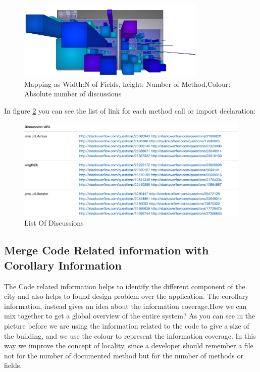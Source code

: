\documentclass[]{usiinfbachelorproject}
\begin{document}
\begin{figure}[H]
	\centering
	\includegraphics[width=0.8\textwidth]{images/discAbsLang}
	
	\caption[Discussion Mapping]{Mapping as Width:N of Fields, height: Number of Method,Colour: Absolute number of discussions\label{fig:disc}}

\end{figure}

In figure \ref{fig:list} you can see the list of link for each method call or import declaration:


 \begin{figure}[H]
	\centering
	\includegraphics[width=1\textwidth]{images/listOfDiscussions}
		\caption[List Of Discussions]{List Of Discussions \label{fig:list}
}

\end{figure}


\subsection{Merge Code Related information with Corollary Information}
The Code related information helps to identify the different component of the city and also helps to found design problem over the application. The corollary information, instead gives an idea about the information coverage.How we can mix together to get a global overview of the entire system? As you can see in the picture before we are using the information related to the code to give a size of the building, and we use  the colour to represent the information coverage. In this way we improve the concept of locality, since a developer should remember a file not for the number of documented method but for the number of methods or fields.  
\end{document}
